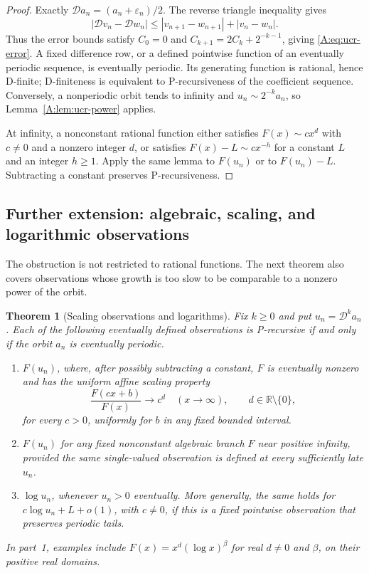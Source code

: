 \documentclass[11pt,a4paper]{article}
\newtheorem{theorem}{Theorem}[section]
\theoremstyle{definition}
\theoremstyle{remark}
\numberwithin{equation}{section}
\begin{document}
\begin{proof}
Exactly $\mathcal D a_n=(a_n+\varepsilon_n)/2$.
The reverse triangle inequality gives
\[
 |\mathcal Dv_n-\mathcal Dw_n|
 \leq |v_{n+1}-w_{n+1}|+|v_n-w_n|.
\]
Thus the error bounds satisfy $C_0=0$ and
$C_{k+1}=2C_k+2^{-k-1}$, giving \eqref{A:eq:ucr-error}.
A fixed difference row, or a defined pointwise function of an eventually
periodic sequence, is eventually periodic. Its generating function is
rational, hence D-finite; D-finiteness is equivalent to P-recursiveness
of the coefficient sequence. Conversely, a nonperiodic orbit tends to
infinity and $u_n\sim2^{-k}a_n$, so Lemma~\ref{A:lem:ucr-power} applies.

At infinity, a nonconstant rational function either satisfies
$F(x)\sim cx^d$ with $c\ne0$ and a nonzero integer $d$, or satisfies
$F(x)-L\sim cx^{-h}$ for a constant $L$ and an integer $h\geq1$.
Apply the same lemma to $F(u_n)$ or to $F(u_n)-L$.
Subtracting a constant preserves P-recursiveness.
\end{proof}

\subsection{Further extension: algebraic, scaling, and logarithmic observations}

The obstruction is not restricted to rational functions.
The next theorem also covers observations whose growth is too slow to
be comparable to a nonzero power of the orbit.

\begin{theorem}[Scaling observations and logarithms]
\label{A:thm:ucr-scaling-log}
Fix $k\geq0$ and put $u_n=\mathcal D^k a_n$.
Each of the following eventually defined observations is P-recursive
if and only if the orbit $a_n$ is eventually periodic.
\begin{enumerate}
\item $F(u_n)$, where, after possibly subtracting a constant, $F$ is
eventually nonzero and has the uniform affine scaling property
\[
 \frac{F(cx+b)}{F(x)}\longrightarrow c^d
 \quad(x\to\infty),\qquad d\in\mathbb R\setminus\{0\},
\]
for every $c>0$, uniformly for $b$ in any fixed bounded interval.
\item $F(u_n)$ for any fixed nonconstant algebraic branch $F$ near
positive infinity, provided the same single-valued observation is
defined at every sufficiently late $u_n$.
\item $\log u_n$, whenever $u_n>0$ eventually. More generally, the same
holds for $c\log u_n+L+o(1)$, with $c\ne0$, if this is a fixed
pointwise observation that preserves periodic tails.
\end{enumerate}
In part~1, examples include $F(x)=x^d(\log x)^\beta$ for real
$d\ne0$ and $\beta$, on their positive real domains.
\end{theorem}
\end{document}
